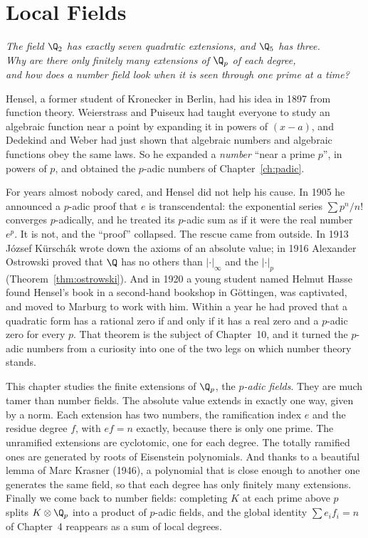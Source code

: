 \chapter{Local Fields}
\begin{center}\itshape
The field $\Q_2$ has exactly seven quadratic extensions, and $\Q_5$ has three.\\
Why are there only finitely many extensions of $\Q_p$ of each degree,\\
and how does a number field look when it is seen through one prime at a time?
\end{center}

Hensel, a former student of Kronecker in Berlin, had his idea in 1897 from function theory. Weierstrass and Puiseux had
taught everyone to study an algebraic function near a point by expanding it in powers of $(x-a)$, and Dedekind and Weber
had just shown that algebraic numbers and algebraic functions obey the same laws. So he expanded a \emph{number} ``near a
prime $p$'', in powers of $p$, and obtained the $p$-adic numbers of Chapter~\ref{ch:padic}.

For years almost nobody cared, and Hensel did not help his cause. In 1905 he announced a $p$-adic proof that $e$ is
transcendental: the exponential series $\sum p^n/n!$ converges $p$-adically, and he treated its $p$-adic sum as if it were
the real number $e^p$. It is not, and the ``proof'' collapsed. The rescue came from outside. In 1913 J\'ozsef K\"ursch\'ak
wrote down the axioms of an absolute value; in 1916 Alexander Ostrowski proved that $\Q$ has no others than $|\cdot|_\infty$
and the $|\cdot|_p$ (Theorem~\ref{thm:ostrowski}). And in 1920 a young student named Helmut Hasse found Hensel's book in a
second-hand bookshop in G\"ottingen, was captivated, and moved to Marburg to work with him. Within a year he had proved that
a quadratic form has a rational zero if and only if it has a real zero and a $p$-adic zero for every $p$. That theorem is the
subject of Chapter~10, and it turned the $p$-adic numbers from a curiosity into one of the two legs on which number theory
stands.

This chapter studies the finite extensions of $\Q_p$, the \emph{$p$-adic fields}. They are much tamer than number fields.
The absolute value extends in exactly one way, given by a norm. Each extension has two numbers, the ramification index $e$
and the residue degree $f$, with $ef=n$ exactly, because there is only one prime. The unramified extensions are cyclotomic,
one for each degree. The totally ramified ones are generated by roots of Eisenstein polynomials. And thanks to a beautiful
lemma of Marc Krasner (1946), a polynomial that is close enough to another one generates the same field, so that each
degree has only finitely many extensions. Finally we come back to number fields: completing $K$ at each prime above $p$
splits $K\otimes\Q_p$ into a product of $p$-adic fields, and the global identity $\sum e_if_i=n$ of Chapter~4 reappears as a
sum of local degrees.


